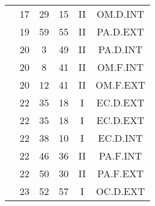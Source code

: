\documentclass[12pt, a4paper]{article}
\begin{document}
\begin{multicols}{3}
{\begin{tabular}{c c c c c c}
	 	 	 	 & 17 & 29 & 15 & II & OM.D.INT\\%
	 	 	 	 & 19 & 59 & 55 & II & PA.D.EXT\\%
	 	 	 	 & 20 & 3 & 49 & II & PA.D.INT\\%
	 	 	 	 & 20 & 8 & 41 & II & OM.F.INT\\%
	 	 	 	 & 20 & 12 & 41 & II & OM.F.EXT\\%
	 	 	 	 & 22 & 35 & 18 & I & EC.D.EXT\\%
	 	 	 	 & 22 & 35 & 18 & I & EC.D.EXT\\%
	 	 	 	 & 22 & 38 & 10 & I & EC.D.INT\\%
	 	 	 	 & 22 & 46 & 36 & II & PA.F.INT\\%
	 	 	 	 & 22 & 50 & 30 & II & PA.F.EXT\\%
	 	 	 	 & 23 & 52 & 57 & I & OC.D.EXT\\%
	 	 \end{tabular}
 	}
\end{multicols}
\end{document}
